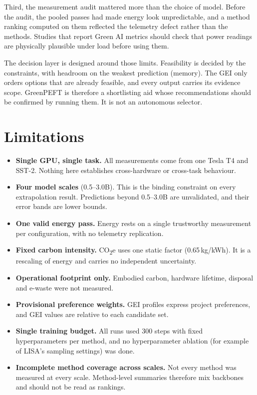 \documentclass[conference]{IEEEtran}
\newcommand{\COtwo}{CO\textsubscript{2}e}
\begin{document}
Third, the measurement audit mattered more than the choice of model. Before the audit, the
pooled passes had made energy look unpredictable, and a method ranking computed on them
reflected the telemetry defect rather than the methods. Studies that report Green AI
metrics should check that power readings are physically plausible under load before using
them.

The decision layer is designed around those limits. Feasibility is decided by the
constraints, with headroom on the weakest prediction (memory). The GEI only orders options
that are already feasible, and every output carries its evidence scope. GreenPEFT is
therefore a shortlisting aid whose recommendations should be confirmed by running them. It is
not an autonomous selector.

\section{Limitations}

\begin{itemize}
\item \textbf{Single GPU, single task.} All measurements come from one Tesla T4 and SST-2.
Nothing here establishes cross-hardware or cross-task behaviour.
\item \textbf{Four model scales} (0.5--3.0B). This is the binding constraint on every
extrapolation result. Predictions beyond 0.5--3.0B are unvalidated, and their error bands
are lower bounds.
\item \textbf{One valid energy pass.} Energy rests on a single trustworthy measurement per
configuration, with no telemetry replication.
\item \textbf{Fixed carbon intensity.} \COtwo{} uses one static factor (0.65\,kg/kWh). It is a
rescaling of energy and carries no independent uncertainty.
\item \textbf{Operational footprint only.} Embodied carbon, hardware lifetime, disposal and
e-waste were not measured.
\item \textbf{Provisional preference weights.} GEI profiles express project preferences, and
GEI values are relative to each candidate set.
\item \textbf{Single training budget.} All runs used 300 steps with fixed hyperparameters per
method, and no hyperparameter ablation (for example of LISA's sampling settings) was done.
\item \textbf{Incomplete method coverage across scales.} Not every method was measured at
every scale. Method-level summaries therefore mix backbones and should not be read as
rankings.
\end{itemize}
\end{document}

